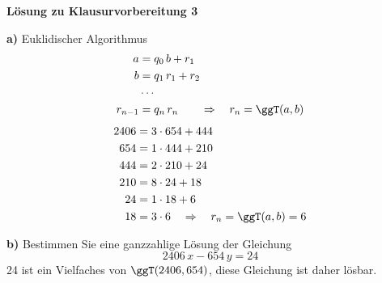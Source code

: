 \textbf{Lösung zu Klausurvorbereitung 3}

\begin{loesung}
\textbf{a)} Euklidischer Algorithmus
\begin{align*}
a &= q_0\, b + r_1\\
b &= q_1\, r_1 + r_2\\
&\cdots\\
r_{n-1} &= q_n\, r_n \qquad \Rightarrow \quad r_n = \ggT(a, b)
\end{align*}
\begin{align*}
2406 &= 3 \cdot 654 + 444\\
654 &= 1 \cdot 444 + 210\\
444 &= 2 \cdot 210 + 24\\
210 &= 8 \cdot 24 + 18\\
24 &= 1 \cdot 18 + 6\\
18 &= 3 \cdot 6 \quad \Rightarrow \quad r_n = \ggT(a, b) = 6
\end{align*}

\textbf{b)} Bestimmen Sie eine ganzzahlige Lösung der Gleichung
\[ 2406\,x - 654\,y = 24 \]
24 ist ein Vielfaches von $\ggT(2406, 654)$, diese Gleichung ist daher lösbar.


\end{loesung}
